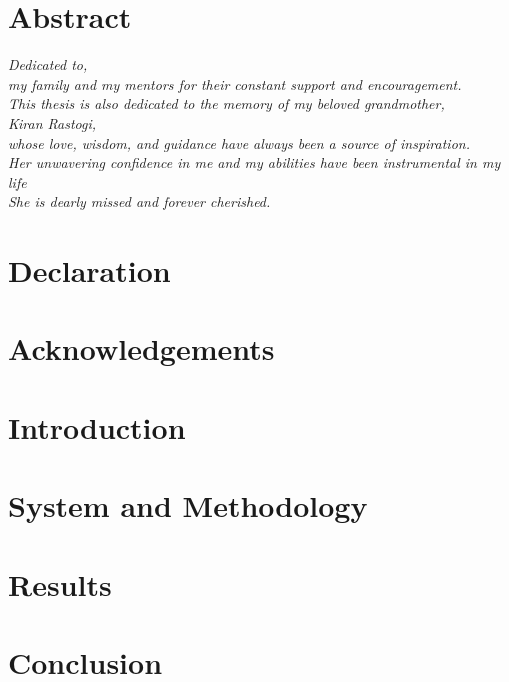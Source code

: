\documentclass[12pt]{report}
\begin{document}


\chapter*{\centering \Large Abstract}


\newpage
\clearpage
\thispagestyle{empty}  %
\vspace*{\fill}
\begin{center}
    \textit{ %
        Dedicated to, \\
        my family and my mentors
        for their constant support and encouragement.\\ \vspace*{0.5cm}
        This thesis is also dedicated to the memory of my beloved grandmother,\\
        Kiran Rastogi,\\
        whose love, wisdom, and guidance have always been a source of inspiration.\\
        Her unwavering confidence in me and my abilities have been instrumental in my life\\
        She is dearly missed and forever cherished.
    }
\end{center}
\vspace*{\fill}


\chapter*{Declaration}


\chapter*{Acknowledgements}


\tableofcontents

\chapter{Introduction}\label{chap:Introduction}


\chapter{System and Methodology}\label{chap:Methodology}


\chapter{Results}\label{chap:Results and Discussions}


\chapter*{Conclusion}\label{chap:Conclusion}



\singlespacing

\end{document}
